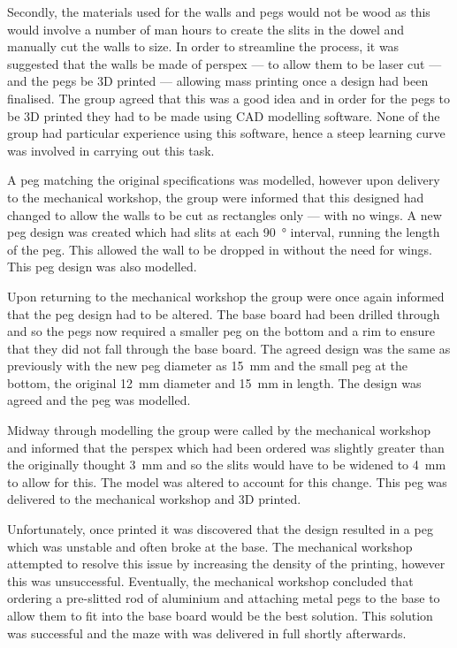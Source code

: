 Secondly, the materials used for the walls and pegs would not be wood as this 
would involve a number of man hours to create the slits in the dowel and 
manually cut the walls to size. In order to streamline the process, it was 
suggested that the walls be made of perspex --- to allow 
them to be laser cut --- and the pegs be 3D printed --- allowing mass printing 
once a design had been finalised. The group agreed that this was a good idea and 
in order for the pegs to be 3D printed they had to be made using CAD modelling 
software. None of the group had particular experience using this software, hence 
a steep learning curve was involved in carrying out this task. 

A peg matching the original specifications was modelled, however upon delivery 
to the mechanical workshop, the group were informed that this designed had 
changed to allow the walls to be cut as rectangles only --- with no wings. A new 
peg design was created which had slits at each \SI{90}{\degree} interval, 
running the length of the peg. This allowed the wall to be dropped in without 
the need for wings. This peg design was also modelled. 

Upon returning to the mechanical workshop the group were once again informed 
that the peg design had to be altered. The base board had been drilled through 
and so the pegs now required a smaller peg on the bottom and a rim to ensure 
that they did not fall through the base board. The agreed design was the same as 
previously with the new peg diameter as \SI{15}{\mm} and the small peg at the 
bottom, the original \SI{12}{\mm} diameter and \SI{15}{\mm} in length. The 
design was agreed and the peg was modelled. 

Midway through modelling the group were called by the mechanical workshop and 
informed that the perspex which had been ordered was slightly greater than the 
originally thought \SI{3}{\mm} and so the slits would have to be widened to 
\SI{4}{\mm} to allow for this. The model was altered to account for this change. 
This peg was delivered to the mechanical workshop and 3D printed. 

Unfortunately, once printed it was discovered that the design resulted in a peg 
which was unstable and often broke at the base. The mechanical workshop 
attempted to resolve this issue by increasing the density of the printing, 
however this was unsuccessful. Eventually, the mechanical workshop concluded 
that ordering a pre-slitted rod of aluminium and attaching metal pegs to the 
base to allow them to fit into the base board would be the best solution. This 
solution was successful and the maze with  was 
delivered in full shortly afterwards. 

